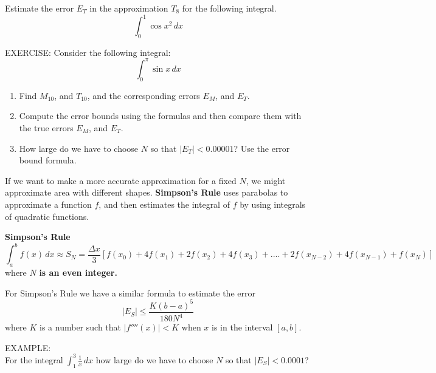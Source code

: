 \documentclass[11pt]{article}
\begin{document}
\pagebreak

Estimate the error $E_T$ in the approximation $T_8$ for the following integral.
\begin{displaymath}
\int_0^1\cos{x^2} \,dx 
\end{displaymath}

\vspace{5in}

EXERCISE:
Consider the following integral:
\begin{displaymath}
\int_0^{\pi}\sin{x} \,dx 
\end{displaymath}
\begin{enumerate}
\item{Find $M_{10}$, and $T_{10}$, and the corresponding errors $E_M$, and $E_T$.}
\item{Compute the error bounds using the formulas and then compare them with the true errors $E_M$, and $E_T$.}
\item{How large do we have to choose $N$ so that $|E_T| < 0.00001$? Use the error bound formula.}
\end{enumerate}


\pagebreak

If we want to make a more accurate approximation for a fixed $N$, we might approximate area with different shapes.  {\bf Simpson's Rule} uses parabolas to approximate a function $f$, and then estimates the integral of $f$ by using integrals of quadratic functions.

\vspace{6in}

{\bf Simpson's Rule}
\begin{displaymath}
\int_a^bf(x)\,dx \approx S_N = \frac{\Delta x}{3}\left[f(x_0) + 4f(x_1) + 2f(x_2) +  4f(x_3) + .... + 2f(x_{N-2}) + 4f(x_{N-1}) + f(x_N)\right]
\end{displaymath}
where $N$ {\bf is an even integer.}

\pagebreak

For Simpson's Rule we have a similar formula to estimate the error
\begin{displaymath}
|E_S| \leq \frac{K(b-a)^5}{180N^4} 
\end{displaymath}
where $K$ is a number such that $|f''''(x)| < K$ when $x$ is in the interval $[a,b]$.

\vspace{0.5cm}

EXAMPLE:\\

For the integral $\int_1^3 \frac{1}{x} \, dx$  how large do we have to choose $N$ so that $|E_S| < 0.0001$? 
\end{document}
